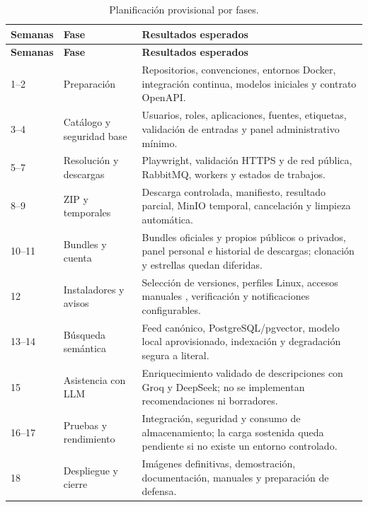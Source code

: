 \begin{longtable}{p{}p{}p{}}
	\caption{Planificación provisional por fases.}\label{tabla:planificacion}                                                                                                        \\
	\toprule
	\textbf{Semanas} & \textbf{Fase}             & \textbf{Resultados esperados}                                                                                                     \\
	\midrule
	\endfirsthead
	\toprule
	\textbf{Semanas} & \textbf{Fase}             & \textbf{Resultados esperados}                                                                                                     \\
	\midrule
	\endhead
	1--2             & Preparación               & Repositorios, convenciones, entornos Docker, integración continua, modelos iniciales y contrato OpenAPI.                          \\
	3--4             & Catálogo y seguridad base & Usuarios, roles, aplicaciones, fuentes, etiquetas, validación de entradas y panel administrativo mínimo.                          \\
	5--7             & Resolución y descargas    & Playwright, validación HTTPS y de red pública, RabbitMQ, workers y estados de trabajos.                                           \\
	8--9             & ZIP y temporales          & Descarga controlada, manifiesto, resultado parcial, MinIO temporal, cancelación y limpieza automática.                            \\
	10--11           & Bundles y cuenta          & Bundles oficiales y propios públicos o privados, panel personal e historial de descargas; clonación y estrellas quedan diferidas. \\
	12               & Instaladores y avisos     & Selección de versiones, perfiles Linux, accesos manuales \ruta{.url}, verificación y notificaciones configurables.                \\
	13--14           & Búsqueda semántica        & Feed canónico, PostgreSQL/pgvector, modelo local aprovisionado, indexación y degradación segura a literal.                        \\
	15               & Asistencia con LLM        & Enriquecimiento validado de descripciones con Groq y DeepSeek; no se implementan recomendaciones ni borradores.                   \\
	16--17           & Pruebas y rendimiento     & Integración, seguridad y consumo de almacenamiento; la carga sostenida queda pendiente si no existe un entorno controlado.        \\
	18               & Despliegue y cierre       & Imágenes definitivas, demostración, documentación, manuales y preparación de defensa.                                             \\
	\bottomrule
\end{longtable}

